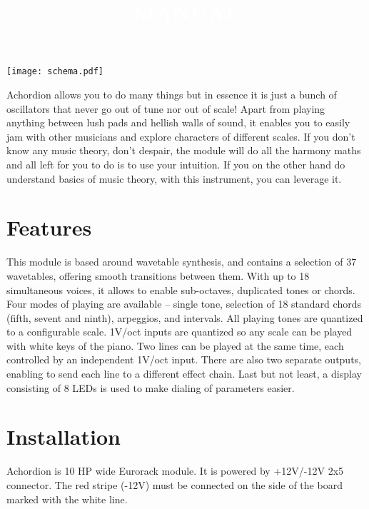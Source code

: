 \documentclass[10pt,nofoldmark,nocombine]{leaflet} %
\begin{document}
\title{\textcolor{white}{MANUAL}}
\author{}
\date{}
\maketitle

\begin{center}
  \texttt{[image: schema.pdf]}
\end{center}

\newpage

\vspace{5mm}

Achordion allows you to do many things but in essence it is just a bunch of oscillators that never go out of tune nor out of scale! Apart from playing anything between lush pads and hellish walls of sound, it enables you to easily jam with other musicians and explore characters of different scales. If you don't know any music theory, don't despair, the module will do all the harmony maths and all left for you to do is to use your intuition. If you on the other hand do understand basics of music theory, with this instrument, you can leverage it.

\section{Features}

This module is based around wavetable synthesis, and contains a selection of 37 wavetables, offering smooth transitions between them. With up to 18 simultaneous voices, it allows to enable sub-octaves, duplicated tones or chords. Four modes of playing are available – single tone, selection of 18 standard chords (fifth, sevent and ninth), arpeggios, and intervals. All playing tones are quantized to a configurable scale. 1V/oct inputs are quantized so any scale can be played with white keys of the piano. Two lines can be played at the same time, each controlled by an independent 1V/oct input. There are also two separate outputs, enabling to send each line to a different effect chain. Last but not least, a display consisting of 8 LEDs is used to make dialing of parameters easier.

\section{Installation}

Achordion is 10 HP wide Eurorack module. It is powered by +12V/-12V 2x5 connector. The red stripe (-12V) must be connected on the side of the board marked with the white line.
\end{document}
